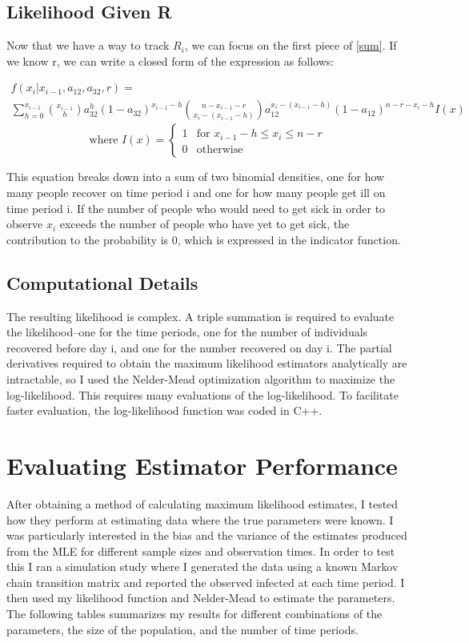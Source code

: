 \documentclass{svproc}
\begin{document}
\subsection*{Likelihood Given R}
Now that we have a way to track $R_i$, we can focus on the first piece of \eqref{sum}. If we know r, we can write a closed form of the expression as follows:

\begin{multline}
f(x_i|x_{i-1}, a_{12}, a_{32}, r) = \\ \sum_{h=0}^{x_{i-1}}       {{x_{i-1}}\choose{h}} a_{32}^h(1-a_{32})^{x_{i-1}-h}  {{n-x_{i-1}-r}\choose{x_i-(x_{i-1}-h)}}  a_{12}^{x_i-(x_{i-1}-h)} (1-a_{12})^{n - r - x_i-h}I(x)  \end{multline} $$
\text{where } I(x) = \begin{cases} 1 & \text{for } x_{i-1}-h\leq x_i\leq n-r  \\ 0 &\text{otherwise} \end{cases}$$

This equation breaks down into a sum of two binomial densities, one for how many people recover on time period i and one for how many people get ill on time period i. If the number of people who would need to get sick in order to observe $x_i$ exceeds the number of people who have yet to get sick, the contribution to the probability is 0, which is expressed in the indicator function.

\subsection*{Computational Details}
The resulting likelihood is complex. A triple summation is required to evaluate the likelihood--one for the time periods, one for the number of individuals recovered before day i, and one for the number recovered on day i. The partial derivatives required to obtain the maximum likelihood estimators analytically are intractable, so I used the Nelder-Mead optimization algorithm to maximize the log-likelihood. This requires many evaluations of the log-likelihood. To facilitate faster evaluation, the log-likelihood function was coded in C++.

\section{Evaluating Estimator Performance}
After obtaining a method of calculating maximum likelihood estimates, I tested how they perform at estimating data where the true parameters were known. I was particularly interested in the bias and the variance of the estimates produced from the MLE for different sample sizes and observation times. In order to test this I ran a simulation study where I generated the data using a known Markov chain transition matrix and reported the observed infected at each time period. I then used my likelihood function and Nelder-Mead to estimate the parameters. The following tables summarizes my results for different combinations of the parameters, the size of the population, and the number of time periods.
\end{document}
